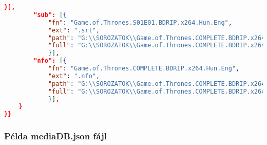 \begin{lstlisting}[language={json}]
            }],
        "sub": [{
            "fn": "Game.of.Thrones.S01E01.BDRIP.x264.Hun.Eng",
            "ext": ".srt",
            "path": "G:\\SOROZATOK\\Game.of.Thrones.COMPLETE.BDRIP.x264.Hun.Eng",
            "full": "G:\\SOROZATOK\\Game.of.Thrones.COMPLETE.BDRIP.x264.Hun.Eng\\Game.of.Thrones.S01E01.BDRIP.x264.Hun.Eng.srt"
            }],
        "nfo": [{
            "fn": "Game.of.Thrones.COMPLETE.BDRIP.x264.Hun.Eng",
            "ext": ".nfo",
            "path": "G:\\SOROZATOK\\Game.of.Thrones.COMPLETE.BDRIP.x264.Hun.Eng",
            "full": "G:\\SOROZATOK\\Game.of.Thrones.COMPLETE.BDRIP.x264.Hun.Eng\\Game.of.Thrones.COMPLETE.BDRIP.x264.Hun.Eng.nfo"
            }],
    }
}}
\end{lstlisting}

\subsubsection{Példa mediaDB.json fájl}

